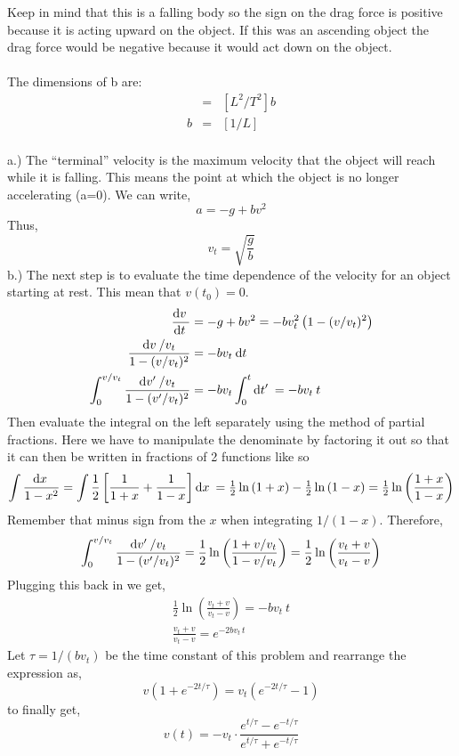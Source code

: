 \documentclass[11pt]{amsart}
\begin{document}
Keep in mind that this is a falling body so the sign on the drag force is positive because it is acting upward on the object. If this was an ascending object the drag force would be negative because it would act down on the object. \\ \\
The dimensions of b are: \\ 
\begin{eqnarray*} 
[L/T^{2}] &=& [L^{2}/T^{2}]b \\
b &=& [1/L] 
\end{eqnarray*} \\
a.) The ``terminal'' velocity is the maximum velocity that the object will reach while it is falling. This means the point at which the object is no longer accelerating (a=0). We can write,
\[ a = -g + b v^2 \]
Thus,
\[ v_t = \sqrt{\frac{g}{b}} \]
b.) The next step is to evaluate the time dependence of the velocity for an object starting at rest. This mean that $v(t_{0}) = 0$. 
\begin{align*}
\frac{\mathrm{d}v \:}{\mathrm{d}t \:} &= -g + bv^{2} = - b v_t^2 \left(1 - (v/v_t)^2 \right)
\\
\frac{\mathrm{d}v \: / v_t}{1 - (v / v_t)^2} &= - b v_t \: \mathrm{d}t \: 
\\
\int_0^{v / v_t} \frac{\mathrm{d}v' \: / v_t}{1 - (v'/v_t)^2} &= - b v_t \int_0^t \mathrm{d}t' \: = - b v_t \: t 
\end{align*}
Then evaluate the integral on the left separately using the method of partial fractions. Here we have to manipulate the denominate by factoring it out so that it can then be written in fractions of 2 functions like so
\begin{align*}
\int \frac{\mathrm{d}x \:}{1 - x^2} = \int \frac{1}{2} \left[ \frac{1}{1 + x} + \frac{1}{1 - x} \right] \mathrm{d}x \: = \tfrac{1}{2} \ln{(1 + x)} - \tfrac{1}{2} \ln{(1 - x)} = \tfrac{1}{2} \ln{\left(\frac{1 + x}{1 - x} \right)}
\end{align*}
Remember that minus sign from the $x$ when integrating $1 / (1 - x)$. Therefore,
\begin{align*}
\int_0^{v / v_t} \frac{\mathrm{d}v' \: / v_t}{1 - (v'/v_t)^2} = \frac{1}{2} \ln{\left( \frac{1 + v / v_t}{1 - v / v_t} \right)} = \frac{1}{2} \ln{\left( \frac{v_t + v}{v_t - v} \right) }
\end{align*}
Plugging this back in we get,
\begin{align*}
\frac{1}{2} \ln{\left( \frac{v_t + v}{v_t - v} \right) } = - b v_t \: t
\\
\frac{v_t + v}{v_t - v} = e^{- 2 b v_t \, t}
\end{align*}
Let $\tau = 1/(b v_t)$ be the time constant of this problem and rearrange the expression as,
\[ v \left( 1 + e^{- 2 t / \tau} \right) = v_t \left( e^{-2 t / \tau} - 1 \right) \]
to finally get, 
\[ v(t) = - v_t \cdot \frac{e^{t / \tau} - e^{-t / \tau}}{e^{t / \tau}  + e^{-t / \tau}} \]
\end{document}
